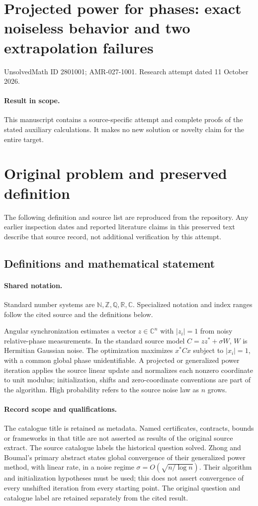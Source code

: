 \documentclass[11pt]{article}
\begin{document}
\section*{Projected power for phases: exact noiseless behavior and two extrapolation failures}
\noindent UnsolvedMath ID 2801001; AMR-027-1001. Research attempt dated 11 October 2026.
\paragraph{Result in scope.}This manuscript contains a source-specific attempt and complete proofs of the stated auxiliary calculations. It makes no new solution or novelty claim for the entire target.
\section{Original problem and preserved definition}
The following definition and source list are reproduced from the repository. Any earlier inspection dates and reported literature claims in this preserved text describe that source record, not additional verification by this attempt.
\subsection{Definitions and mathematical statement}

\paragraph{Shared notation.}Standard number systems are $\mathbb N,\mathbb Z,\mathbb Q,\mathbb R,\mathbb C$. Specialized notation and index ranges follow the cited source and the definitions below.


Angular synchronization estimates a vector $z\in\mathbb C^n$ with $|z_i|=1$ from noisy relative-phase measurements. In the standard source model $C=zz^*+\sigma W$, $W$ is Hermitian Gaussian noise. The optimization maximizes $x^*Cx$ subject to $|x_i|=1$, with a common global phase unidentifiable. A projected or generalized power iteration applies the source linear update and normalizes each nonzero coordinate to unit modulus; initialization, shifts and zero-coordinate conventions are part of the algorithm. High probability refers to the source noise law as $n$ grows.
\paragraph{Record scope and qualifications.}
The catalogue title is retained as metadata. Named certificates, contracts, bounds or frameworks in that title are not asserted as results of the original source extract.
The source catalogue labels the historical question solved. Zhong and Boumal's primary abstract states global convergence of their generalized power method, with linear rate, in a noise regime $\sigma=O(\sqrt{n/\log n})$. Their algorithm and initialization hypotheses must be used; this does not assert convergence of every unshifted iteration from every starting point. The original question and catalogue label are retained separately from the cited result.
\end{document}
